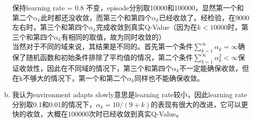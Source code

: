 \documentclass[a4paper, 11pt]{article}
\begin{document}
\begin{enumerate}[(a)]
保持learning rate = 0.8 不变，episode分别取10000和100000，显然第一个和第二个$\alpha_k$此时都还没收敛，而第三个和第四个$\alpha_k$已经收敛了。经检验，在9000左右时，第三个和第四个$\alpha_k$完成收敛到真实Q-Value（因为在$k < 10000$时，第三个和第四个$\alpha_k$有相同的取值，故为同时收敛的）\\
当然对于不同的域来说，其结果是不同的。首先第一个条件$\sum\limits _{k=1}^\infty \alpha_k = \infty$确保了随机函数和初始条件排除了平均值的情况，第二个条件$\sum\limits_{k=1}^\infty \alpha_k^2 < \infty$保证收敛性，因此在不同域的情况下，第三个和第四个$\alpha_k$不一定能确保收敛，但在k不够大的情况下，第一个和第二个$\alpha_k$同样也不能确保收敛。
\item
我认为environment adapts slowly意思是learning rate较小，因此learning rate分别取0.1和0.01的情况下，$\alpha_k = 10/(9+k)$的表现有很大的改进，它可以更快的收敛，大概在100000次时已经收敛到真实Q-Value。

\end{enumerate}



%
%
\end{document}
